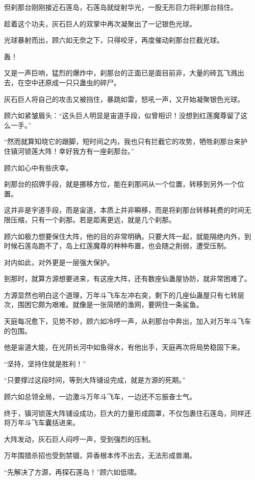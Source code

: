 \begin{this_body}
但刹那台刚刚接近石莲岛，石莲岛就绽射华光，一股无形巨力将刹那台挡住。

趁着这个功夫，灰石巨人的双掌中再次凝聚出了一记银色光球。

光球暴射而出，顾六如无奈之下，只得咬牙，再度催动刹那台拦截光球。

轰！

又是一声巨响，猛烈的爆炸中，刹那台的正面已是面目前非，大量的砖瓦飞溅出去，在空中还原成一只只蛊虫的碎尸。

灰石巨人将自己的攻击又被挡住，暴跳如雷，怒吼一声，又开始凝聚银色光球。

顾六如紧皱眉头：“这头巨人明显是宙道手段，似曾相识！没想到红莲魔尊留了这么一手。”

“然而就算知晓它的跟脚，短时间之内，我也只有拦截它的攻势，牺牲刹那台来护住镇河锁莲大阵！幸好我方有一座刹那台。”

顾六如心中有些庆幸。

刹那台的招牌手段，就是挪移方位，能在刹那间从一个位置，转移到另外一个位置。

这并非是宇道手段，而是宙道，本质上并非瞬移，而是将刹那台转移耗费的时间无限压缩，只有一个刹那。若是距离更远，就是几个刹那。

顾六如极力想要保住大阵，他的目的非常明确。只要大阵一起，就能隔绝内外，到时候石莲岛跑不了，岛上红莲魔尊的种种布置，也会随之削弱，遭受压制。

对内如此，对外更是一层强大保护。

到那时，就算方源想要进来，有这座大阵，还有数座仙蛊屋协防，就非常困难了。

方源显然也明白这个道理，万年斗飞车左冲右突，剩下的几座仙蛊屋只有七转层次，围困它颇为艰难。就像是一张简陋的渔网，要网住一条鲨鱼。

天庭每况愈下，见势不妙，顾六如冷哼一声，从刹那台中奔出，加入对万年斗飞车的包围。

他是宙道大能，在光阴长河中如鱼得水，有他出手，天庭再次将局势稳固下来。

“坚持，坚持住就是胜利！”

“只要撑过这段时间，等到大阵铺设完成，就是方源的死期。”

顾六如总领全局，一边激斗万年斗飞车，一边还不忘振奋士气。

终于，镇河锁莲大阵铺设成功，巨大的力量形成圆罩，不仅包裹住石莲岛，同样还将万年斗飞车囊括进来。

大阵发动，灰石巨人闷哼一声，受到强烈的压制。

万年围猎杀招也受到禁锢，异香根本传不出去，无法形成兽潮。

“先解决了方源，再探石莲岛！”顾六如低啸。


\end{this_body}
